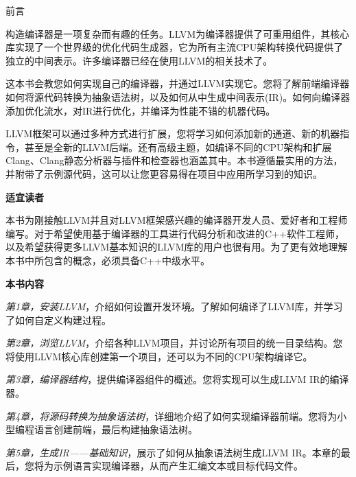 \begin{flushright}
	 前言
\end{flushright}

构造编译器是一项复杂而有趣的任务。LLVM为编译器提供了可重用组件，其核心库实现了一个世界级的优化代码生成器，它为所有主流CPU架构转换代码提供了独立的中间表示。许多编译器已经在使用LLVM的相关技术了。\par

这本书会教您如何实现自己的编译器，并通过LLVM实现它。您将了解前端编译器如何将源代码转换为抽象语法树，以及如何从中生成中间表示(IR)。如何向编译器添加优化流水，对IR进行优化，并编译为性能不错的机器代码。\par

LLVM框架可以通过多种方式进行扩展，您将学习如何添加新的通道、新的机器指令，甚至是全新的LLVM后端。还有高级主题，如编译不同的CPU架构和扩展Clang、Clang静态分析器与插件和检查器也涵盖其中。本书遵循最实用的方法，并附带了示例源代码，这可以让您更容易得在项目中应用所学习到的知识。\par

\hspace*{\fill} \par %
\textbf{适宜读者}

本书为刚接触LLVM并且对LLVM框架感兴趣的编译器开发人员、爱好者和工程师编写。对于希望使用基于编译器的工具进行代码分析和改进的C++软件工程师，以及希望获得更多LLVM基本知识的LLVM库的用户也很有用。为了更有效地理解本书中所包含的概念，必须具备C++中级水平。\par

\hspace*{\fill} \par %
\textbf{本书内容}

\textit{第1章，安装LLVM}，介绍如何设置开发环境。了解如何编译了LLVM库，并学习了如何自定义构建过程。\par

\textit{第2章，浏览LLVM}，介绍各种LLVM项目，并讨论所有项目的统一目录结构。您将使用LLVM核心库创建第一个项目，还可以为不同的CPU架构编译它。\par

\textit{第3章，编译器结构}，提供编译器组件的概述。您将实现可以生成LLVM IR的编译器。\par

\textit{第4章，将源码转换为抽象语法树}，详细地介绍了如何实现编译器前端。您将为小型编程语言创建前端，最后构建抽象语法树。\par

\textit{第5章，生成IR——基础知识}，展示了如何从抽象语法树生成LLVM IR。本章的最后，您将为示例语言实现编译器，从而产生汇编文本或目标代码文件。\par

